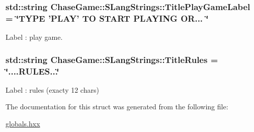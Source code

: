 \hypertarget{struct_chase_game_1_1_s_lang_strings_a2c84435e4b127789447a00398ac5c2b1}{
\subsubsection[{Title\-Play\-Game\-Label}]{\setlength{\rightskip}{0pt plus 5cm}std\-::string Chase\-Game\-::\-S\-Lang\-Strings\-::\-Title\-Play\-Game\-Label = \char`\"{}T\-Y\-P\-E 'P\-L\-A\-Y' T\-O S\-T\-A\-R\-T P\-L\-A\-Y\-I\-N\-G O\-R... \char`\"{}}}\label{struct_chase_game_1_1_s_lang_strings_a2c84435e4b127789447a00398ac5c2b1}


Label \-: play game. 

\hypertarget{struct_chase_game_1_1_s_lang_strings_a80834f6e732fff6fae2ea0f2e341c7bd}{
\subsubsection[{Title\-Rules}]{\setlength{\rightskip}{0pt plus 5cm}std\-::string Chase\-Game\-::\-S\-Lang\-Strings\-::\-Title\-Rules = \char`\"{}....R\-U\-L\-E\-S...\char`\"{}}}\label{struct_chase_game_1_1_s_lang_strings_a80834f6e732fff6fae2ea0f2e341c7bd}


Label \-: rules (exacty 12 chars) 



The documentation for this struct was generated from the following file\-:\begin{DoxyCompactItemize}
\item 
\hyperlink{globals_8hxx}{globals.\-hxx}\end{DoxyCompactItemize}
